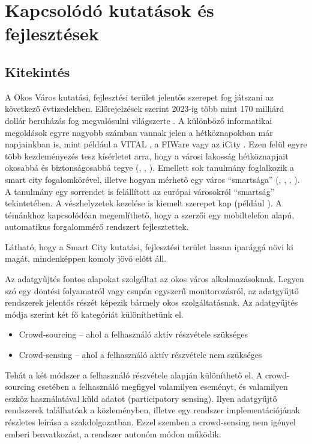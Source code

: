 \documentclass[a4paper,12pt]{report}
\begin{document}
\chapter{Kapcsolódó kutatások és fejlesztések}

\section{Kitekintés}

A Okos Város kutatási, fejlesztési terület jelentős szerepet fog játszani az következő évtizedekben. Előrejelzések szerint 2023-ig több mint 170 milliárd dollár beruházás fog megvalósulni világszerte \cite{navigant}. A különböző informatikai megoldások egyre nagyobb számban vannak jelen a hétköznapokban már napjainkban is, mint például a VITAL \cite{vital}, a FI\-Ware \cite{fiware} vagy az iCity \cite{icity}. Ezen felül egyre több kezdeményezés tesz kísérletet arra, hogy a városi lakosság hétköznapjait okosabbá és biztonságosabbá tegye (\cite{smartsantander}, \cite{futureglasgow}, \cite{myneighbourhood}). Emellett sok tanulmány foglalkozik a smart city fogalomkörével, illetve hogyan mérhető egy város ``smartsága'' (\cite{yamauchi2014development}, \cite{neirotti2014current}, \cite{de2014smart}, \cite{carli2013measuring}). A \cite{giffinger2007smart} tanulmány egy sorrendet is felállított az európai városokról ``smartság'' tekintetében. A vészhelyzetek kezelése is kiemelt szerepet kap (például \cite{du2012research}). A témánkhoz kapcsolódóan megemlíthető, hogy a \cite{mohan2008nericell} szerzői egy mobiltelefon alapú, automatikus forgalommérő rendszert fejlesztettek.

Látható, hogy a Smart City kutatási, fejlesztési terület lassan iparággá növi ki magát, mindenképpen komoly jövő előtt áll.

Az adatgyűjtés fontos alapokat szolgáltat az okos város alkalmazásoknak. Legyen szó egy döntési folyamatról vagy csupán egyszerű monitorozásról, az adatgyűjtő rendszerek jelentős részét képezik bármely okos szolgáltatásnak. Az adatgyűjtés módja szerint két fő kategóriát különíthetünk el.

\begin{itemize}
\item Crowd-sourcing -- ahol a felhasználó aktív részvétele szükséges
\item Crowd-sensing -- ahol a felhasználó aktív részvétele nem szükséges
\end{itemize}

Tehát a két módszer a felhasználó részvétele alapján különíthető el. A crowd-sourcing esetében a felhasználó megfigyel valamilyen eseményt, és valamilyen eszköz használatával küld adatot (participatory sensing). Ilyen adatgyűjtő rendszerek találhatóak a \cite{szabo2013framework} közleményben, illetve egy rendszer implementációjának részletes leírása a \cite{besenczi2013kozossegi} szakdolgozatban. Ezzel szemben a crowd-sensing nem igényel emberi beavatkozást, a rendszer autonóm módon működik.
\end{document}
